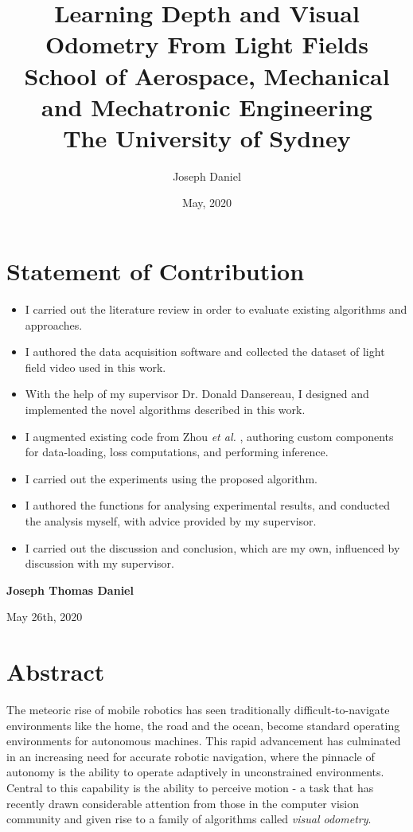 \documentclass[openany]{book}
\title{\textbf{Learning Depth and Visual Odometry From Light Fields} \\
\large School of Aerospace, Mechanical and Mechatronic Engineering \\
\large The University of Sydney}
\date{May, 2020}
\author{Joseph Daniel}
\begin{document}
\frontmatter

\chapter*{Statement of Contribution}

\begin{itemize}
  \item I carried out the literature review in order to evaluate existing algorithms and approaches.
  \item I authored the data acquisition software and collected the dataset of light field video used in this work. 
  \item With the help of my supervisor Dr. Donald Dansereau, I designed and implemented the novel algorithms described in this work.
  \item I augmented existing code from Zhou \textit{et al.} \cite{zhou2017unsupervised}, authoring custom components for data-loading, loss computations, and performing inference.
  \item I carried out the experiments using the proposed algorithm.
  \item I authored the functions for analysing experimental results, and conducted the analysis myself, with advice provided by my supervisor. 
  \item I carried out the discussion and conclusion, which are my own, influenced by discussion with my supervisor.
\end{itemize}


\textbf{Joseph Thomas Daniel} 

May 26th, 2020

\maketitle


\chapter*{Abstract}

The meteoric rise of mobile robotics has seen traditionally difficult-to-navigate environments like the home, the road and the ocean, become standard operating environments for autonomous machines. This rapid advancement has culminated in an increasing need for accurate robotic navigation, where the pinnacle of autonomy is the ability to operate adaptively in unconstrained environments. Central to this capability is the ability to perceive motion - a task that has recently drawn considerable attention from those in the computer vision community and given rise to a family of algorithms called \textit{visual odometry}. 
\end{document}

